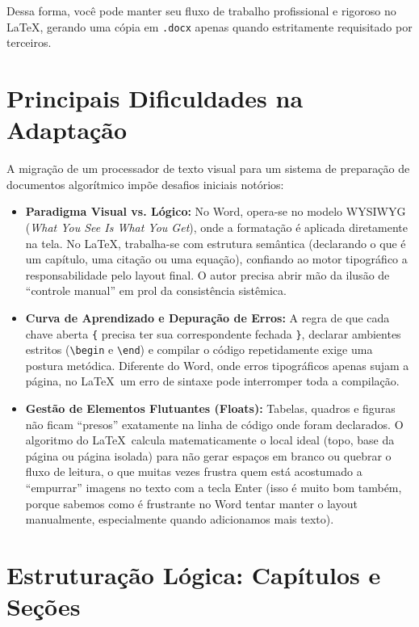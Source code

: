\documentclass[12pt, a4paper]{article}
\begin{document}
Dessa forma, você pode manter seu fluxo de trabalho profissional e rigoroso no \LaTeX, gerando uma cópia em \texttt{.docx} apenas quando estritamente requisitado por terceiros.

\section{Principais Dificuldades na Adaptação}

A migração de um processador de texto visual para um sistema de preparação de documentos algorítmico impõe desafios iniciais notórios:

\begin{itemize}
    \item \textbf{Paradigma Visual vs. Lógico:} No Word, opera-se no modelo WYSIWYG (\textit{What You See Is What You Get}), onde a formatação é aplicada diretamente na tela. No \LaTeX, trabalha-se com estrutura semântica (declarando o que é um capítulo, uma citação ou uma equação), confiando ao motor tipográfico a responsabilidade pelo layout final. O autor precisa abrir mão da ilusão de ``controle manual'' em prol da consistência sistêmica.
    \item \textbf{Curva de Aprendizado e Depuração de Erros:} A regra de que cada chave aberta \texttt{\{} precisa ter sua correspondente fechada \texttt{\}}, declarar ambientes estritos (\texttt{\textbackslash begin} e \texttt{\textbackslash end}) e compilar o código repetidamente exige uma postura metódica. Diferente do Word, onde erros tipográficos apenas sujam a página, no \LaTeX \ um erro de sintaxe pode interromper toda a compilação.
    \item \textbf{Gestão de Elementos Flutuantes (Floats):} Tabelas, quadros e figuras não ficam ``presos'' exatamente na linha de código onde foram declarados. O algoritmo do \LaTeX \ calcula matematicamente o local ideal (topo, base da página ou página isolada) para não gerar espaços em branco ou quebrar o fluxo de leitura, o que muitas vezes frustra quem está acostumado a ``empurrar'' imagens no texto com a tecla Enter (isso é muito bom também, porque sabemos como é frustrante no Word tentar manter o layout manualmente, especialmente quando adicionamos mais texto).
\end{itemize}

\section{Estruturação Lógica: Capítulos e Seções}
\end{document}
